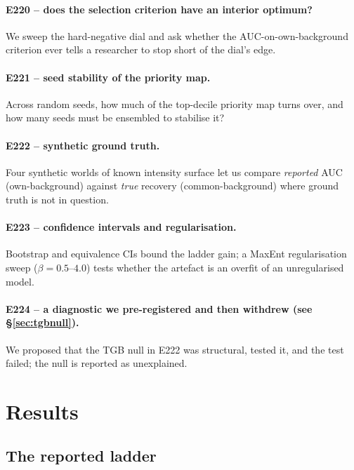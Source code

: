 \documentclass[12pt]{article}
\begin{document}
\paragraph{E220 -- does the selection criterion have an interior optimum?}
We sweep the hard-negative dial and ask whether the AUC-on-own-background criterion ever tells a researcher to stop short of the dial's edge.

\paragraph{E221 -- seed stability of the priority map.}
Across random seeds, how much of the top-decile priority map turns over, and how many seeds must be ensembled to stabilise it?

\paragraph{E222 -- synthetic ground truth.}
Four synthetic worlds of known intensity surface let us compare \emph{reported} AUC (own-background) against \emph{true} recovery (common-background) where ground truth is not in question.

\paragraph{E223 -- confidence intervals and regularisation.}
Bootstrap and equivalence CIs bound the ladder gain; a MaxEnt regularisation sweep ($\beta = 0.5$--$4.0$) tests whether the artefact is an overfit of an unregularised model.

\paragraph{E224 -- a diagnostic we pre-registered and then withdrew (see \S\ref{sec:tgbnull}).}
We proposed that the TGB null in E222 was structural, tested it, and the test failed; the null is reported as unexplained.

\section{Results}

\subsection{The reported ladder}
\label{sec:ladder}
\end{document}
